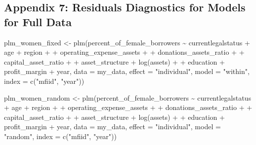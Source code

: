 \documentclass[a4paper,nobind]{templates/ociamthesis}
\newenvironment{Shaded}{\begin{snugshade}}{\end{snugshade}}
\newcommand{\AttributeTok}[1]{\textcolor[rgb]{0.77,0.63,0.00}{#1}}
\newcommand{\FunctionTok}[1]{\textcolor[rgb]{0.00,0.00,0.00}{#1}}
\newcommand{\NormalTok}[1]{#1}
\newcommand{\OtherTok}[1]{\textcolor[rgb]{0.56,0.35,0.01}{#1}}
\newcommand{\SpecialCharTok}[1]{\textcolor[rgb]{0.00,0.00,0.00}{#1}}
\newcommand{\StringTok}[1]{\textcolor[rgb]{0.31,0.60,0.02}{#1}}
\renewenvironment{Shaded}
{
  \vspace{10pt}%
  \begin{snugshade}%
}{%
  \end{snugshade}%
  \vspace{8pt}%
}
\begin{document}
\begin{landscape}
\newpage

\hypertarget{appendix-7-residuals-diagnostics-for-models-for-full-data}{%
\subsection{Appendix 7: Residuals Diagnostics for Models for Full Data}\label{appendix-7-residuals-diagnostics-for-models-for-full-data}}

\begin{Shaded}
\begin{Highlighting}[]
\NormalTok{plm\_women\_fixed }\OtherTok{\textless{}{-}} \FunctionTok{plm}\NormalTok{(percent\_of\_female\_borrowers }\SpecialCharTok{\textasciitilde{}}\NormalTok{ currentlegalstatus }\SpecialCharTok{+}\NormalTok{ age }\SpecialCharTok{+}\NormalTok{ region }\SpecialCharTok{+}
\SpecialCharTok{+}\NormalTok{           operating\_expense\_assets }\SpecialCharTok{+} 
\SpecialCharTok{+}\NormalTok{           donations\_assets\_ratio }\SpecialCharTok{+} 
\SpecialCharTok{+}\NormalTok{           capital\_asset\_ratio }\SpecialCharTok{+}
\SpecialCharTok{+}\NormalTok{           asset\_structure }\SpecialCharTok{+} \FunctionTok{log}\NormalTok{(assets) }\SpecialCharTok{+} 
\SpecialCharTok{+}\NormalTok{           education }\SpecialCharTok{+}\NormalTok{ profit\_margin }\SpecialCharTok{+}\NormalTok{ year, }
               \AttributeTok{data =}\NormalTok{ my\_data, }\AttributeTok{effect =} \StringTok{"individual"}\NormalTok{, }\AttributeTok{model =} \StringTok{"within"}\NormalTok{, }
      \AttributeTok{index =} \FunctionTok{c}\NormalTok{(}\StringTok{"mfiid"}\NormalTok{, }\StringTok{"year"}\NormalTok{))}

\NormalTok{plm\_women\_random }\OtherTok{\textless{}{-}} \FunctionTok{plm}\NormalTok{(percent\_of\_female\_borrowers }\SpecialCharTok{\textasciitilde{}}\NormalTok{ currentlegalstatus }\SpecialCharTok{+}\NormalTok{ age }\SpecialCharTok{+}\NormalTok{ region }\SpecialCharTok{+}
\SpecialCharTok{+}\NormalTok{           operating\_expense\_assets }\SpecialCharTok{+} 
\SpecialCharTok{+}\NormalTok{           donations\_assets\_ratio }\SpecialCharTok{+} 
\SpecialCharTok{+}\NormalTok{           capital\_asset\_ratio }\SpecialCharTok{+}
\SpecialCharTok{+}\NormalTok{           asset\_structure }\SpecialCharTok{+} \FunctionTok{log}\NormalTok{(assets) }\SpecialCharTok{+} 
\SpecialCharTok{+}\NormalTok{           education }\SpecialCharTok{+}\NormalTok{ profit\_margin }\SpecialCharTok{+}\NormalTok{ year, }
               \AttributeTok{data =}\NormalTok{ my\_data, }\AttributeTok{effect =} \StringTok{"individual"}\NormalTok{, }\AttributeTok{model =} \StringTok{"random"}\NormalTok{, }
      \AttributeTok{index =} \FunctionTok{c}\NormalTok{(}\StringTok{"mfiid"}\NormalTok{, }\StringTok{"year"}\NormalTok{))}


\end{Highlighting}
\end{Shaded}
\end{landscape}
\end{document}
